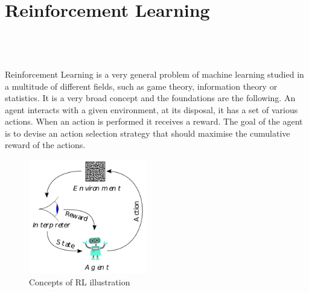 
\setcounter{chapter}{1}

\chapter{Reinforcement Learning}
\mbox{}\\
\mbox{}\\
\mbox{}\\
Reinforcement Learning\cite{kaelbling1996reinforcement} is a very general problem of machine learning studied in a multitude of different fields, such as game theory, information theory or statistics. It is a very broad concept and the foundations are the following. An agent interacts with a given environment, at its disposal, it has a set of various actions. When an action is performed it receives a reward. The goal of the agent is to devise an action selection strategy that should maximise the cumulative reward of the actions.

\begin{figure}[h]
	\begin{center}
		\includegraphics*[height=5cm]{figures/rl_broad.png}
		\caption{ Concepts of RL illustration\protect\cite{wiki:rl}}	
	\end{center}
\end{figure}

